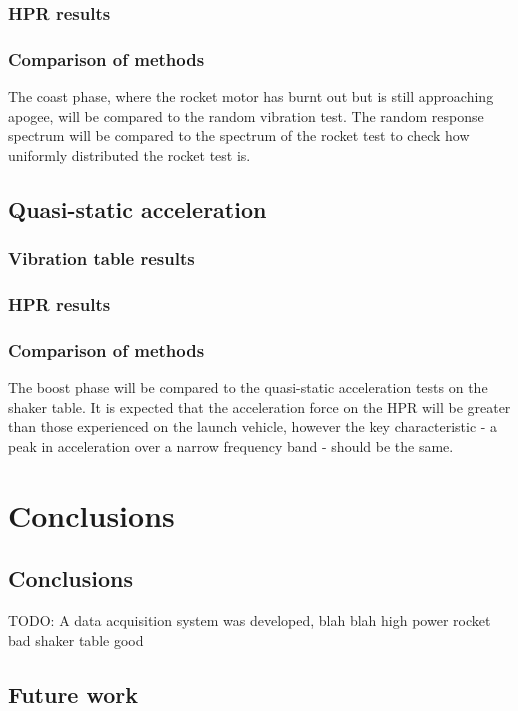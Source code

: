 \documentclass[draft]{report}
\begin{document}
\subsection{HPR results}
\subsection{Comparison of methods}
The coast phase, where the rocket motor has burnt out but is still approaching apogee, will be compared to the random vibration test. The random response spectrum will be compared to the spectrum of the rocket test to check how uniformly distributed the rocket test is.

\section{Quasi-static acceleration}
\subsection{Vibration table results}
\subsection{HPR results}
\subsection{Comparison of methods}
The boost phase will be compared to the quasi-static acceleration tests on the shaker table. It is expected that the acceleration force on the HPR will be greater than those experienced on the launch vehicle, however the key characteristic - a peak in acceleration over a narrow frequency band - should be the same.

\chapter{Conclusions}

\section{Conclusions}

TODO: A data acquisition system was developed, blah blah high power rocket bad shaker table good

\section{Future work}
\end{document}

